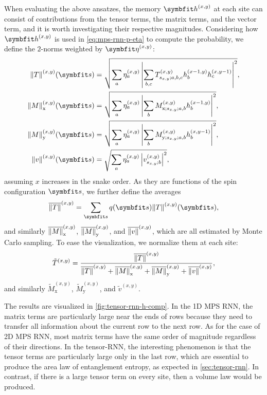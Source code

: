 When evaluating the above ansatzes, the memory $\vh^{(x, y)}$ at each site can consist of contributions from the tensor terms, the matrix terms, and the vector term, and it is worth investigating their respective magnitudes. Considering how $\vh^{(x, y)}$ is used in \cref{eq:mps-rnn-p-eta} to compute the probability, we define the $2$-norms weighted by $\vet^{(x, y)}$:
\begin{align}
\norm{T}^{(x, y)}(\vs) &= \sqrt{\sum_a \eta^{(x, y)}_a \left| \sum_{b, c} T^{(x, y)}_{s_{x, y}; a, b, c} h^{(x - 1, y)}_b h^{(x, y - 1)}_c \right|^2}, \\
\norm{M}^{(x, y)}_\text{x}(\vs) &= \sqrt{\sum_a \eta^{(x, y)}_a \left| \sum_b M^{(x, y)}_{\text{x}; s_{x, y}; a, b} h^{(x - 1, y)}_b \right|^2}, \\
\norm{M}^{(x, y)}_\text{y}(\vs) &= \sqrt{\sum_a \eta^{(x, y)}_a \left| \sum_b M^{(x, y)}_{\text{y}; s_{x, y}; a, b} h^{(x, y - 1)}_b \right|^2}, \\
\norm{v}^{(x, y)}(\vs) &= \sqrt{\sum_a \eta^{(x, y)}_a \left| v^{(x, y)}_{s_{x, y}; b} \right|^2},
\end{align}
assuming $x$ increases in the snake order. As they are functions of the spin configuration $\vs$, we further define the averages
\begin{equation}
\overline{\norm{T}}^{(x, y)} = \sum_\vs q(\vs) \norm{T}^{(x, y)}(\vs),
\end{equation}
and similarly $\overline{\norm{M}}^{(x, y)}_\text{x}$, $\overline{\norm{M}}^{(x, y)}_\text{y}$, and $\overline{\norm{v}}^{(x, y)}$, which are all estimated by Monte Carlo sampling. To ease the visualization, we normalize them at each site:
\begin{equation}
\tilde{T}^{(x, y)} = \frac{\overline{\norm{T}}^{(x, y)}}{\overline{\norm{T}}^{(x, y)} + \overline{\norm{M}}^{(x, y)}_\text{x} + \overline{\norm{M}}^{(x, y)}_\text{y} + \overline{\norm{v}}^{(x, y)}},
\end{equation}
and similarly $\tilde{M}^{(x, y)}_\text{x}$, $\tilde{M}^{(x, y)}_\text{y}$, and $\tilde{v}^{(x, y)}$.

The results are visualized in \cref{fig:tensor-rnn-h-comp}. In the 1D MPS RNN, the matrix terms are particularly large near the ends of rows because they need to transfer all information about the current row to the next row. As for the case of 2D MPS RNN, most matrix terms have the same order of magnitude regardless of their directions. In the tensor-RNN, the interesting phenomenon is that the tensor terms are particularly large only in the last row, which are essential to produce the area law of entanglement entropy, as expected in \cref{sec:tensor-rnn}. In contrast, if there is a large tensor term on every site, then a volume law would be produced.

